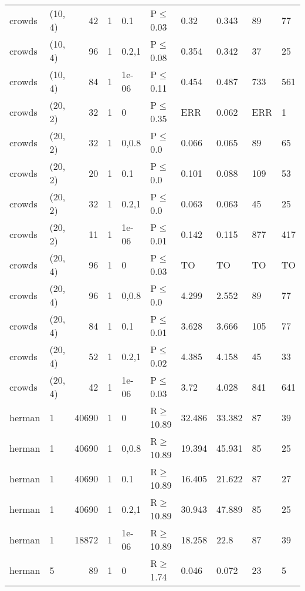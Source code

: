 \begin{longtable}{llrrllllll}
 crowds        & (10, 4)  &     	42 & 1 & 0.1   & P$\leq$0.03  & 0.32    & 0.343   & 89      & 77   \\
 crowds        & (10, 4)  &     	96 & 1 & 0.2,1 & P$\leq$0.08  & 0.354   & 0.342   & 37      & 25   \\
 crowds        & (10, 4)  &     	84 & 1 & 1e-06 & P$\leq$0.11  & 0.454   & 0.487   & 733     & 561  \\
 crowds        & (20, 2)  &     	32 & 1 & 0     & P$\leq$0.35  & ERR     & 0.062   & ERR     & 1    \\
 crowds        & (20, 2)  &     	32 & 1 & 0,0.8 & P$\leq$0.0   & 0.066   & 0.065   & 89      & 65   \\
 crowds        & (20, 2)  &     	20 & 1 & 0.1   & P$\leq$0.0   & 0.101   & 0.088   & 109     & 53   \\
 crowds        & (20, 2)  &     	32 & 1 & 0.2,1 & P$\leq$0.0   & 0.063   & 0.063   & 45      & 25   \\
 crowds        & (20, 2)  &     	11 & 1 & 1e-06 & P$\leq$0.01  & 0.142   & 0.115   & 877     & 417  \\
 crowds        & (20, 4)  &     	96 & 1 & 0     & P$\leq$0.03  & TO      & TO      & TO      & TO   \\
 crowds        & (20, 4)  &     	96 & 1 & 0,0.8 & P$\leq$0.0   & 4.299   & 2.552   & 89      & 77   \\
 crowds        & (20, 4)  &     	84 & 1 & 0.1   & P$\leq$0.01  & 3.628   & 3.666   & 105     & 77   \\
 crowds        & (20, 4)  &     	52 & 1 & 0.2,1 & P$\leq$0.02  & 4.385   & 4.158   & 45      & 33   \\
 crowds        & (20, 4)  &     	42 & 1 & 1e-06 & P$\leq$0.03  & 3.72    & 4.028   & 841     & 641  \\
 herman        & 1        &  	40690 & 1 & 0     & R$\geq$10.89 & 32.486  & 33.382  & 87      & 39   \\
 herman        & 1        &  	40690 & 1 & 0,0.8 & R$\geq$10.89 & 19.394  & 45.931  & 85      & 25   \\
 herman        & 1        &  	40690 & 1 & 0.1   & R$\geq$10.89 & 16.405  & 21.622  & 87      & 27   \\
 herman        & 1        &  	40690 & 1 & 0.2,1 & R$\geq$10.89 & 30.943  & 47.889  & 85      & 25   \\
 herman        & 1        &  	18872 & 1 & 1e-06 & R$\geq$10.89 & 18.258  & 22.8    & 87      & 39   \\
 herman        & 5        &     	89 & 1 & 0     & R$\geq$1.74  & 0.046   & 0.072   & 23      & 5    \\

\end{longtable}
